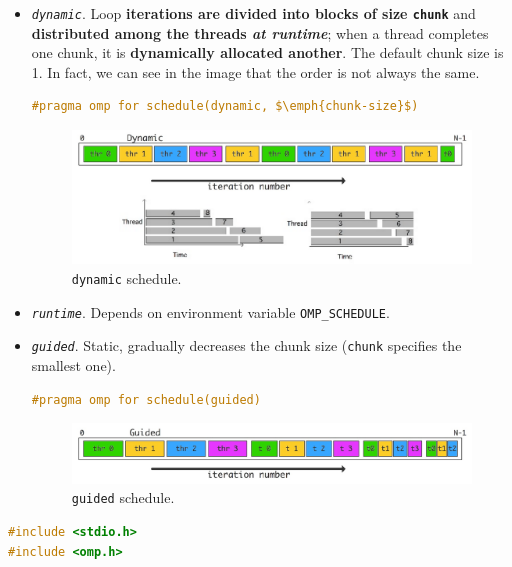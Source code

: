 \begin{itemize}
\begin{itemize}
        \item \texttt{\emph{dynamic}}. Loop \textbf{iterations are divided into blocks of size \texttt{chunk}} and \textbf{distributed among the threads \emph{at runtime}}; when a thread completes one chunk, it is \textbf{dynamically allocated another}. The default chunk size is 1. In fact, we can see in the image that the order is not always the same.
        \begin{openmpbox}
\begin{lstlisting}[language=C++, mathescape=true]
#pragma omp for schedule(dynamic, $\emph{chunk-size}$)\end{lstlisting}
        \end{openmpbox}
        \begin{figure}[!htp]
            \centering
            \includegraphics[width=\textwidth]{img/openmp-for-3.pdf}
            \caption{\texttt{dynamic} schedule.}
        \end{figure}
        
        \item \texttt{\emph{runtime}}. Depends on environment variable \texttt{OMP\_SCHEDULE}.

        \item \texttt{\emph{guided}}. Static, gradually decreases the chunk size (\texttt{chunk} specifies the smallest one).
        \begin{openmpbox}
\begin{lstlisting}[language=C++, mathescape=true]
#pragma omp for schedule(guided)\end{lstlisting}
        \end{openmpbox}
        \begin{figure}[!htp]
            \centering
            \includegraphics[width=\textwidth]{img/openmp-for-4.pdf}
            \caption{\texttt{guided} schedule.}
        \end{figure}
    \end{itemize}
    \begin{examplebox}
\begin{lstlisting}[language=C++]
#include <stdio.h>
#include <omp.h>


\end{lstlisting}
\end{examplebox}
\end{itemize}
